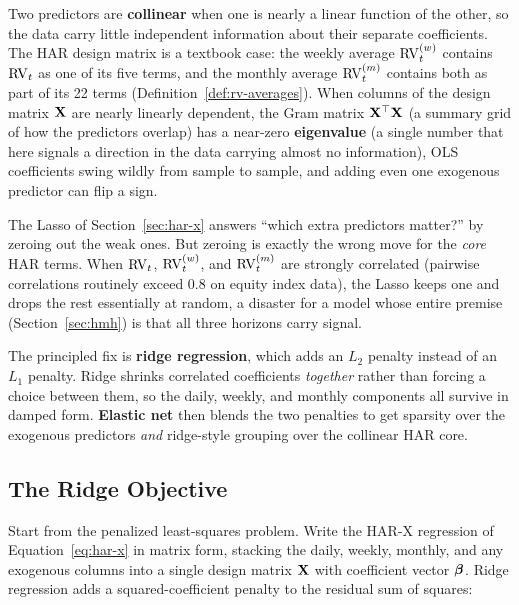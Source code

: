 \begin{prereq}
Two predictors are \textbf{collinear} when one is nearly a linear function of the other, so the data carry little independent information about their separate coefficients.
The HAR design matrix is a textbook case: the weekly average $\operatorname{RV}^{(w)}_t$ contains $\operatorname{RV}_t$ as one of its five terms, and the monthly average $\operatorname{RV}^{(m)}_t$ contains both as part of its 22 terms (Definition~\ref{def:rv-averages}).
When columns of the design matrix $\mathbf{X}$ are nearly linearly dependent, the Gram matrix $\mathbf{X}^\top\mathbf{X}$ (a summary grid of how the predictors overlap) has a near-zero \textbf{eigenvalue} (a single number that here signals a direction in the data carrying almost no information), OLS coefficients swing wildly from sample to sample, and adding even one exogenous predictor can flip a sign.
\end{prereq}

The Lasso of Section~\ref{sec:har-x} answers ``which extra predictors matter?'' by zeroing out the weak ones.
But zeroing is exactly the wrong move for the \emph{core} HAR terms.
When $\operatorname{RV}_t$, $\operatorname{RV}^{(w)}_t$, and $\operatorname{RV}^{(m)}_t$ are strongly correlated (pairwise correlations routinely exceed $0.8$ on equity index data), the Lasso keeps one and drops the rest essentially at random, a disaster for a model whose entire premise (Section~\ref{sec:hmh}) is that all three horizons carry signal.

The principled fix is \textbf{ridge regression}, which adds an $L_2$ penalty instead of an $L_1$ penalty.
Ridge shrinks correlated coefficients \emph{together} rather than forcing a choice between them, so the daily, weekly, and monthly components all survive in damped form.
\textbf{Elastic net} then blends the two penalties to get sparsity over the exogenous predictors \emph{and} ridge-style grouping over the collinear HAR core.

\subsection{The Ridge Objective}

Start from the penalized least-squares problem.
Write the HAR-X regression of Equation~\eqref{eq:har-x} in matrix form, stacking the daily, weekly, monthly, and any exogenous columns into a single design matrix $\mathbf{X}$ with coefficient vector $\bm{\beta}$.
Ridge regression \citep{HoerlKennard1970} adds a squared-coefficient penalty to the residual sum of squares:

